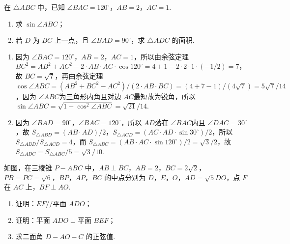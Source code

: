 \begin{problem}
在 \(\triangle ABC\) 中，已知 \(\angle BAC=120^\circ\)，\(AB=2\)，\(AC=1\).

\begin{enumerate}
\item 求 \(\sin \angle ABC\)；
\item 若 \(D\) 为 \(BC\) 上一点，且 \(\angle BAD=90^\circ\)，求 \(\triangle ADC\) 的面积.
\end{enumerate}
\end{problem}

\begin{solution}
\begin{enumerate}\item 因为 \(\angle BAC=120^{\circ}\)，\(AB=2\)，\(AC=1\)，所以由余弦定理 \(BC^{2}=AB^{2}+AC^{2}-2\cdot AB\cdot AC\cdot\cos 120^{\circ}=4+1-2\cdot 2\cdot 1\cdot\left(-1/2\right)=7\)，故 \(BC=\sqrt{7}\)，再由余弦定理 \(\cos\angle ABC=\left(AB^{2}+BC^{2}-AC^{2}\right)/\left(2\cdot AB\cdot BC\right)=\left(4+7-1\right)/\left(4\sqrt{7}\right)=5\sqrt{7}/14\)，因为 \(\angle ABC\)为三角形内角且对边 \(AC\)最短故为锐角，所以 \(\sin\angle ABC=\sqrt{1-\cos^{2}\angle ABC}=\sqrt{21}/14\).\item 因为 \(\angle BAD=90^{\circ}\)，\(\angle BAC=120^{\circ}\)，所以 \(AD\)落在 \(\angle BAC\)内且 \(\angle DAC=30^{\circ}\)，故 \(S_{\triangle ABD}=\left(AB\cdot AD\right)/2\)，\(S_{\triangle ACD}=\left(AC\cdot AD\cdot\sin 30^{\circ}\right)/2\)，所以 \(S_{\triangle ABD}/S_{\triangle ACD}=4\)，而 \(S_{\triangle ABC}=\left(AB\cdot AC\cdot\sin 120^{\circ}\right)/2=\sqrt{3}/2\)，故 \(S_{\triangle ADC}=S_{\triangle ABC}/5=\sqrt{3}/10\).\end{enumerate}
\end{solution}

\begin{problem}
如图，在三棱锥 \(P-ABC\) 中，\(AB\perp BC\)，\(AB=2\)，\(BC=2\sqrt2\)，\(PB=PC=\sqrt6\)，\(BP\)，\(AP\)，\(BC\) 的中点分别为 \(D\)，\(E\)，\(O\)，\(AD=\sqrt5 DO\)，点 \(F\) 在 \(AC\) 上，\(BF\perp AO\).



\begin{enumerate}
\item 证明：\(EF // \text{平面 }ADO\)；
\item 证明：\(\text{平面 }ADO\perp\text{平面 }BEF\)；
\item 求二面角 \(D-AO-C\) 的正弦值.
\end{enumerate}

\end{problem}

